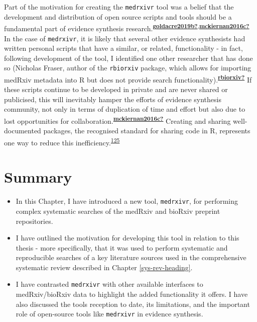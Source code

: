\documentclass[a4paper, twoside]{templates/ociamthesis}
\begin{document}
Part of the motivation for creating the \texttt{medrxivr} tool was a belief that the development and distribution of open source scripts and tools should be a fundamental part of evidence synthesis research.\textsuperscript{\protect\hyperlink{ref-goldacre2019b}{\textbf{goldacre2019b?}},\protect\hyperlink{ref-mckiernan2016c}{\textbf{mckiernan2016c?}}} In the case of \texttt{medrxivr}, it is likely that several other evidence synthesists had written personal scripts that have a similar, or related, functionality - in fact, following development of the tool, I identified one other researcher that has done so (Nicholas Fraser, author of the \texttt{rbiorxiv} package, which allows for importing medRxiv metadata into R but does not provide search functionality).\textsuperscript{\protect\hyperlink{ref-rbiorxiv}{\textbf{rbiorxiv?}}} If these scripts continue to be developed in private and are never shared or publicised, this will inevitably hamper the efforts of evidence synthesis community, not only in terms of duplication of time and effort but also due to lost opportunities for collaboration.\textsuperscript{\protect\hyperlink{ref-mckiernan2016c}{\textbf{mckiernan2016c?}}} Creating and sharing well-documented packages, the recognised standard for sharing code in R, represents one way to reduce this inefficiency.\textsuperscript{\protect\hyperlink{ref-vuorre2020}{125}}

\hypertarget{summary-1}{%
\section{Summary}\label{summary-1}}

\begin{itemize}
\item
  In this Chapter, I have introduced a new tool, \texttt{medrxivr}, for performing complex systematic searches of the medRxiv and bioRxiv preprint repositories.
\item
  I have outlined the motivation for developing this tool in relation to this thesis - more specifically, that it was used to perform systematic and reproducible searches of a key literature sources used in the comprehensive systematic review described in Chapter \ref{sys-rev-heading}.
\item
  I have contrasted \texttt{medrxivr} with other available interfaces to medRxiv/bioRxiv data to highlight the added functionality it offers. I have also discussed the tools reception to date, its limitations, and the important role of open-source tools like \texttt{medrxivr} in evidence synthesis.
\end{itemize}
\end{document}
